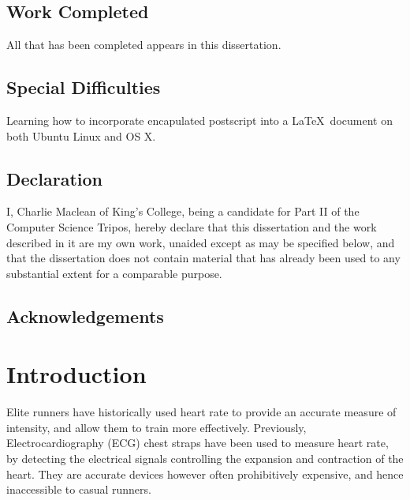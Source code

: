 \documentclass[12pt,a4paper,twoside,openright]{report}
\begin{document}
\section*{Work Completed}

All that has been completed appears in this dissertation.

\section*{Special Difficulties}

Learning how to incorporate encapulated postscript into a \LaTeX\
document on both Ubuntu Linux and OS X.
 
\newpage
\section*{Declaration}

I, Charlie Maclean of King's College, being a candidate for Part II of the 
Computer Science Tripos, hereby declare that this dissertation and the work 
described in it are my own work, unaided except as may be specified below, 
and that the dissertation does not contain material that has already been 
used to any substantial extent for a comparable purpose.

\bigskip
{}

\medskip
{}

\tableofcontents

\listoffigures

\newpage
\section*{Acknowledgements}



\pagestyle{headings}

\chapter{Introduction}

Elite runners have historically used heart rate to provide an accurate 
measure of intensity, and allow them to train more effectively. 
Previously, Electrocardiography (ECG) chest straps have been 
used to measure heart rate, by detecting the electrical signals controlling 
the expansion and contraction of the heart. They are accurate devices however
often prohibitively expensive, and hence inaccessible to casual runners.
\end{document}
